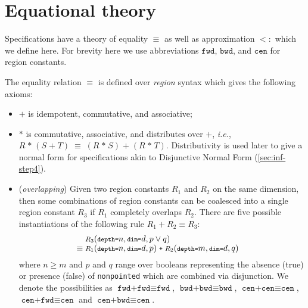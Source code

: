 \documentclass[10pt,preprint]{sigplanconf}
\theoremstyle{definition}
\newcommand{\ie}{\emph{i.e.}}
\newcommand{\term}[1]{\texttt{#1}}
\newcommand{\irrefl}{\texttt{nonpointed}}
\begin{document}
\section{Equational theory}
\label{sec:eqs}

Specifications have a theory of equality $\equiv$ as well
as approximation $<:$ which we define here.
For brevity here we use abbreviations $\term{fwd}$, $\term{bwd}$, and
$\term{cen}$ for region constants.

The equality relation $\equiv$ is defined over \emph{region}
syntax which gives the following axioms:
%
\begin{itemize}
\item $\term{+}$ is idempotent, commutative, and associative;
\item $\term{*}$ is commutative, associative, and distributes over
$\term{+}$, \ie{},  $R \; \texttt{*} \; (S \; \texttt{+} \; T) \; \equiv \; (R \;
                       \texttt{*} \; S) \; \texttt{+} \; (R
                       \; \texttt{*} \; T)$.
Distributivity is
used later to give a normal form for specifications
akin to Disjunctive Normal Form (\cref{sec:inf-step4}).

\item (\emph{overlapping}) Given two region constants $R_1$ and $R_2$
on the same dimension, then some combinations of region constants
can be coalesced into a single region constant $R_3$ if $R_1$ completely
overlaps $R_2$. There are five possible instantiations of the
following rule $R_1 + R_2 \equiv R_3$:
%
\newcommand{\stenGR}[4]{\small{\textit{#4}(\term{depth=}#1,
  \term{dim=}#2, #3)}}
\newcommand{\stenG}[3]{\small{\textit{#3}(\term{depth=}#1,
  \term{dim=}#2)}}
\begin{align*}
\hspace{-1em} & \stenGR{n}{d}{p \vee q}{$R_3$} \\[-0.4em]
\hspace{-1em} \equiv \; & \stenGR{n}{d}{p}{$R_1$} \; \texttt{+} \; \stenGR{m}{d}{q}{$R_2$}
\end{align*}
where $n \geq m$ and $p$ and $q$ range
over booleans representing the absence (true) or presence (false)
of \irrefl{} which are combined via disjunction.
We denote the possibilities as $\term{fwd+fwd} \equiv \term{fwd}$, $\term{bwd+bwd} \equiv \term{bwd}$,
$\term{cen+cen} \equiv \term{cen}$, $\term{cen+fwd} \equiv \term{cen}$ and
$\term{cen+bwd} \equiv \term{cen}$. %


\end{itemize}
\end{document}
